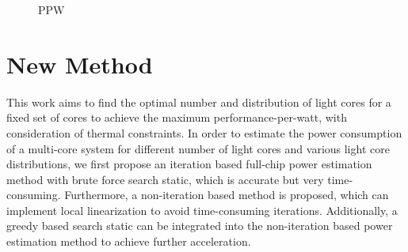 \begin{figure}[htb]
\centering
{}
\caption{PPW}  
\label{fig:ppw}
\end{figure}

\section{New Method}

This work aims to find the optimal number and distribution of light cores for a fixed set of cores to achieve the maximum performance-per-watt, with consideration of thermal constraints. In order to estimate the power consumption of a multi-core system for different number of light cores and various light core distributions, we first propose an iteration based full-chip power estimation method with brute force search static, which is accurate but very time-consuming. Furthermore, a non-iteration based method is proposed, which can implement local linearization to avoid time-consuming iterations. Additionally, a greedy based search static can be integrated into the non-iteration based power estimation method to achieve further acceleration.

